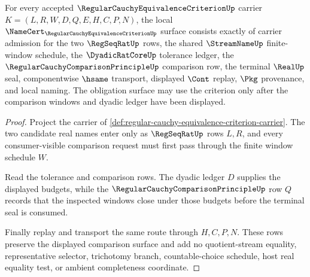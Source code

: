 \begin{theorem}
\label{thm:regular-cauchy-equivalence-criterion-namecert-obligations}
For every accepted $\RegularCauchyEquivalenceCriterionUp$ carrier $K=(L,R,W,D,Q,E,H,C,P,N)$, the local $\NameCert_{\RegularCauchyEquivalenceCriterionUp}$ surface consists exactly of carrier admission for the two $\RegSeqRatUp$ rows, the shared $\StreamNameUp$ finite-window schedule, the $\DyadicRatCoreUp$ tolerance ledger, the $\RegularCauchyComparisonPrincipleUp$ comparison row, the terminal $\RealUp$ seal, componentwise $\hsame$ transport, displayed $\Cont$ replay, $\Pkg$ provenance, and local naming. The obligation surface may use the criterion only after the comparison windows and dyadic ledger have been displayed.
\end{theorem}
\begin{proof}
Project the carrier of \autoref{def:regular-cauchy-equivalence-criterion-carrier}. The two candidate real names enter only as $\RegSeqRatUp$ rows $L,R$, and every consumer-visible comparison request must first pass through the finite window schedule $W$.

Read the tolerance and comparison rows. The dyadic ledger $D$ supplies the displayed budgets, while the $\RegularCauchyComparisonPrincipleUp$ row $Q$ records that the inspected windows close under those budgets before the terminal seal is consumed.

Finally replay and transport the same route through $H,C,P,N$. These rows preserve the displayed comparison surface and add no quotient-stream equality, representative selector, trichotomy branch, countable-choice schedule, host real equality test, or ambient completeness coordinate.
\end{proof}

